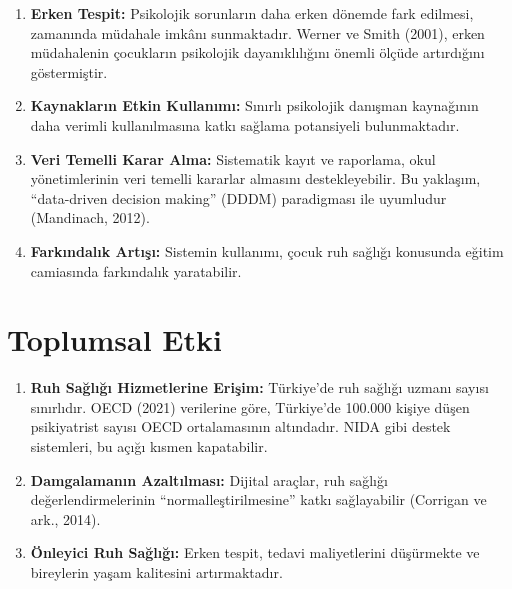 \begin{enumerate}
  \item \textbf{Erken Tespit:} Psikolojik sorunların daha erken dönemde fark edilmesi, zamanında müdahale imkânı sunmaktadır. Werner ve Smith (2001), erken müdahalenin çocukların psikolojik dayanıklılığını önemli ölçüde artırdığını göstermiştir.

  \item \textbf{Kaynakların Etkin Kullanımı:} Sınırlı psikolojik danışman kaynağının daha verimli kullanılmasına katkı sağlama potansiyeli bulunmaktadır.

  \item \textbf{Veri Temelli Karar Alma:} Sistematik kayıt ve raporlama, okul yönetimlerinin veri temelli kararlar almasını destekleyebilir. Bu yaklaşım, ``data-driven decision making'' (DDDM) paradigması ile uyumludur (Mandinach, 2012).

  \item \textbf{Farkındalık Artışı:} Sistemin kullanımı, çocuk ruh sağlığı konusunda eğitim camiasında farkındalık yaratabilir.
\end{enumerate}

\section{Toplumsal Etki}

\begin{enumerate}
  \item \textbf{Ruh Sağlığı Hizmetlerine Erişim:} Türkiye'de ruh sağlığı uzmanı sayısı sınırlıdır. OECD (2021) verilerine göre, Türkiye'de 100.000 kişiye düşen psikiyatrist sayısı OECD ortalamasının altındadır. NIDA gibi destek sistemleri, bu açığı kısmen kapatabilir.

  \item \textbf{Damgalamanın Azaltılması:} Dijital araçlar, ruh sağlığı değerlendirmelerinin ``normalleştirilmesine'' katkı sağlayabilir (Corrigan ve ark., 2014).

  \item \textbf{Önleyici Ruh Sağlığı:} Erken tespit, tedavi maliyetlerini düşürmekte ve bireylerin yaşam kalitesini artırmaktadır.
\end{enumerate}

\newpage
